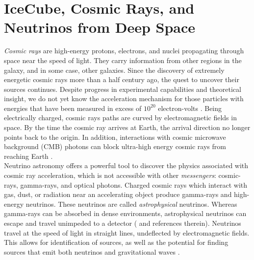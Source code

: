\documentclass[../../../main.tex]{subfiles}
\begin{document}
\section{IceCube, Cosmic Rays, and Neutrinos from Deep Space}
\label{sec:professional}

\textit{Cosmic rays} are high-energy protons, electrons, and nuclei propagating through space near the speed of light.  They carry information from other regions in the galaxy, and in some case, other galaxies.  Since the discovery of extremely energetic cosmic rays more than a half century ago, the quest to uncover their sources continues.  Despite progress in experimental capabilities and theoretical insight, we do not yet know the acceleration mechanism for those particles with energies that have been measured in excess of $10^{20}$ electron-volts \cite{10.1088/1742-6596/1766/1/012002}.  Being electrically charged, cosmic rays paths are curved by electromagnetic fields in space.  By the time the cosmic ray arrives at Earth, the arrival direction no longer points back to the origin.  In addition, interactions with cosmic microwave background (CMB) photons can block ultra-high energy cosmic rays from reaching Earth \cite{PhysRevLett.16.748} \cite{1966JETPL...4...78Z}.
\\
\vspace{0.15cm}
Neutrino astronomy offers a powerful tool to discover the physics associated with cosmic ray acceleration, which is not accessible with other \textit{messengers}: cosmic-rays, gamma-rays, and  optical photons. Charged cosmic rays which interact with gas, dust, or radiation near an accelerating object produce gamma-rays and high-energy neutrinos.  These neutrinos are called \textit{astrophysical} neutrinos. Whereas gamma-rays can be absorbed in dense environments, astrophysical neutrinos can escape and travel unimpeded to a detector (\cite{Astro2020_1} and references therein). Neutrinos travel at the speed of light in straight lines, undeflected by electromagnetic fields.  This allows for identification of sources, as well as the potential for finding sources that emit both neutrinos and gravitational waves \cite{10.3847/2041-8213/ab9d24}.
\\
\vspace{0.15cm}
\end{document}
